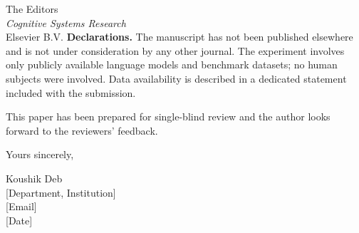 \documentclass[12pt,a4paper]{letter}
\begin{document}
\begin{letter}{%
  The Editors\\
  \textit{Cognitive Systems Research}\\
  Elsevier B.V.}
\textbf{Declarations.}
The manuscript has not been published elsewhere and is not under
consideration by any other journal.
The experiment involves only publicly available language models and benchmark
datasets; no human subjects were involved.
Data availability is described in a dedicated statement included with the
submission.

This paper has been prepared for single-blind review and the author looks
forward to the reviewers' feedback.

\closing{Yours sincerely,}

\vspace{1em}
Koushik Deb\\
{[Department, Institution]}\\
{[Email]}\\
{[Date]}

\end{letter}
\end{document}
